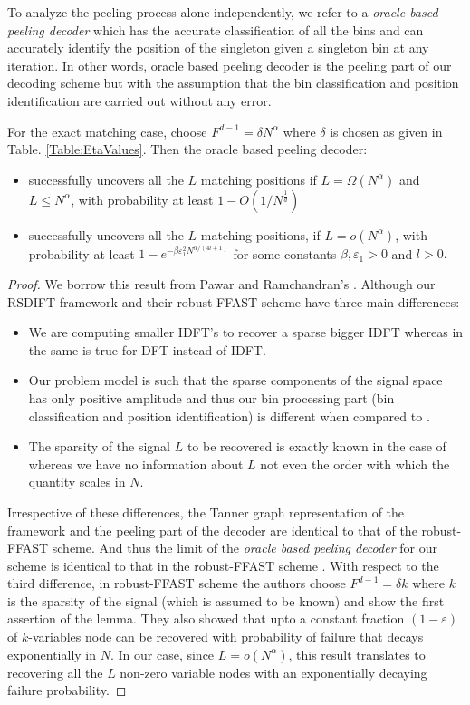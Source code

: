 To analyze the peeling process alone independently, we refer to a {\it oracle based peeling decoder} which has the accurate classification of all the bins and can accurately  identify the position of the singleton given a singleton bin at any iteration. In other words, oracle based peeling decoder is the peeling part of our decoding scheme but with the assumption that the bin classification and position identification are carried out without any error.
\begin{lemma}
For the exact matching case, choose $F^{d-1}=\delta N^\alpha$ where $\delta$ is chosen as given in Table. \ref{Table:EtaValues}. Then the oracle based peeling decoder:
\begin{itemize}
\item successfully uncovers all the $L$ matching positions if $L=\Omega(N^{\alpha})$ and $L\leq N^{\alpha}$, with probability at least $1-O(1/N^{\frac{1}{d}})$
\item successfully uncovers all the $L$ matching positions, if $L=o(N^{\alpha})$, with probability at least $1-e^{-\beta \varepsilon_1^2N^{\alpha/(4l+1)}}$ for some constants $\beta,\varepsilon_1>0$ and $l>0.$
\end{itemize}\label{Lem:peeling_exact}
\end{lemma}
\begin{proof}
We borrow this result from Pawar and Ramchandran's \cite{pawar2014robust}. Although our RSDIFT framework and their robust-FFAST scheme have three main differences:
\begin{itemize}
\item We are computing smaller IDFT's to recover a sparse bigger IDFT whereas in \cite{pawar2014robust} the same is true for DFT instead of IDFT.
\item Our problem model is such that the sparse components of the signal space has only positive amplitude and thus our bin processing part (bin classification and position identification) is different when compared to \cite{pawar2014robust}.
\item The sparsity of the signal $L$ to be recovered is exactly known in the case of \cite{pawar2014robust} whereas we have no information  about $L$ not even the order with which the quantity scales in $N$.
\end{itemize}
Irrespective of these differences, the Tanner graph representation of the framework and the peeling part of the decoder are identical to that of the robust-FFAST scheme. And thus the limit of the {\it oracle based peeling decoder} for our scheme is identical to that in the robust-FFAST scheme \cite{pawar2014robust}.  With respect to the third difference, in robust-FFAST scheme the authors choose $F^{d-1}=\delta k$ where $k$ is the sparsity of the signal (which is assumed to be known) and show the first assertion of the lemma. They also showed that upto a constant fraction $(1-\varepsilon)$ of $k$-variables node can be recovered with probability of failure that decays exponentially in $N$. In our case, since $L=o(N^{\alpha})$, this result translates to recovering all the $L$ non-zero variable nodes with an exponentially decaying failure  probability.
\end{proof}

